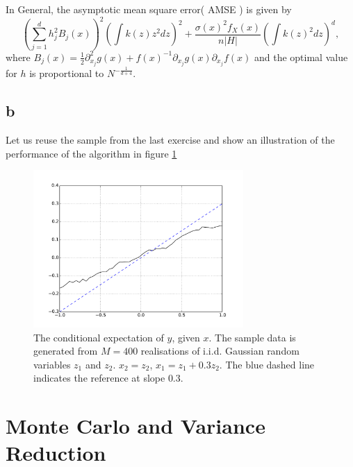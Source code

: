 \documentclass[a4paper,11pt]{article}
\begin{document}
In General, the asymptotic mean square error( AMSE ) is given by
\begin{equation*}
\left( \sum_{j=1}^{d} h_{j}^{2} B_{j}(x) \right)^{2} \left( \int k(z) z^{2} dz \right)^{2} +  \frac{ \sigma(x)^{2} f_{X}(x)}{n|H|}  \left( \int k(z)^2 dz \right)^{d},
\end{equation*}
where $B_{j}(x) = \frac{1}{2} \partial^{2}_{x_j} g(x) + f(x)^{-1} \partial_{x_j} g(x) \partial_{x_j}f(x)$ 
and the optimal value for $h$ is proportional to $N^{-\frac{1}{d+4}}$.

\subsection*{b}

Let us reuse the sample from the last exercise and show an illustration
of the performance of the algorithm in figure \ref{fig:cond}

\begin{figure}
\begin{center}
\includegraphics[width=80mm]{./cond.pdf}
\end{center}
\caption{
\label{fig:cond}
The conditional expectation of $y$, given $x$. The sample data is
generated from $M=400$ realisations of i.i.d. Gaussian random
variables $z_1$ and $z_2$. $x_2=z_2$, $x_1=z_1+0.3z_2$.
The blue dashed line indicates the reference at slope $0.3$.
}
\end{figure}

\section*{Monte Carlo and Variance Reduction}
\end{document}
